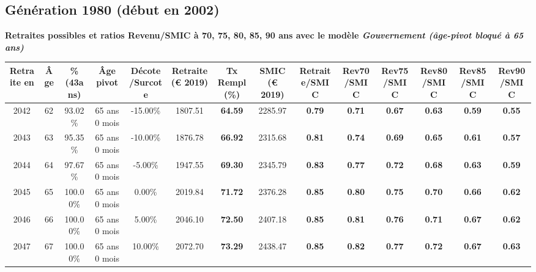 \newpage 
 
\subsection{Génération 1980 (début en 2002)} 

{\bf \noindent Retraites possibles et ratios Revenu/SMIC à 70, 75, 80, 85, 90 ans avec le modèle \emph{Gouvernement (âge-pivot bloqué à 65 ans)}}  
 
\begin{adjustbox}{max width=\textwidth} 
\begin{tabular}[htb]{|c|c||c|c|c||c|c||c||c|c|c|c|c|c|} 
\hline 
 Retraite en &  Âge &  \%(43ans) &  Âge pivot &  Décote/Surcote &  Retraite (\euro{} 2019) &  Tx Rempl(\%) &  SMIC (\euro{} 2019) &  Retraite/SMIC &  Rev70/SMIC &  Rev75/SMIC &  Rev80/SMIC &  Rev85/SMIC &  Rev90/SMIC \\ 
\hline \hline 
 2042 &  62 &  93.02\% &  65 ans 0 mois &  -15.00\% &  1807.51 &  {\bf 64.59} &  2285.97 &  {\bf {\color{red} 0.79}} &  {\bf {\color{red} 0.71}} &  {\bf {\color{red} 0.67}} &  {\bf {\color{red} 0.63}} &  {\bf {\color{red} 0.59}} &  {\bf {\color{red} 0.55}} \\ 
\hline 
 2043 &  63 &  95.35\% &  65 ans 0 mois &  -10.00\% &  1876.78 &  {\bf 66.92} &  2315.68 &  {\bf {\color{red} 0.81}} &  {\bf {\color{red} 0.74}} &  {\bf {\color{red} 0.69}} &  {\bf {\color{red} 0.65}} &  {\bf {\color{red} 0.61}} &  {\bf {\color{red} 0.57}} \\ 
\hline 
 2044 &  64 &  97.67\% &  65 ans 0 mois &  -5.00\% &  1947.55 &  {\bf 69.30} &  2345.79 &  {\bf {\color{red} 0.83}} &  {\bf {\color{red} 0.77}} &  {\bf {\color{red} 0.72}} &  {\bf {\color{red} 0.68}} &  {\bf {\color{red} 0.63}} &  {\bf {\color{red} 0.59}} \\ 
\hline 
 2045 &  65 &  100.00\% &  65 ans 0 mois &  0.00\% &  2019.84 &  {\bf 71.72} &  2376.28 &  {\bf {\color{red} 0.85}} &  {\bf {\color{red} 0.80}} &  {\bf {\color{red} 0.75}} &  {\bf {\color{red} 0.70}} &  {\bf {\color{red} 0.66}} &  {\bf {\color{red} 0.62}} \\ 
\hline 
 2046 &  66 &  100.00\% &  65 ans 0 mois &  5.00\% &  2046.10 &  {\bf 72.50} &  2407.18 &  {\bf {\color{red} 0.85}} &  {\bf {\color{red} 0.81}} &  {\bf {\color{red} 0.76}} &  {\bf {\color{red} 0.71}} &  {\bf {\color{red} 0.67}} &  {\bf {\color{red} 0.62}} \\ 
\hline 
 2047 &  67 &  100.00\% &  65 ans 0 mois &  10.00\% &  2072.70 &  {\bf 73.29} &  2438.47 &  {\bf {\color{red} 0.85}} &  {\bf {\color{red} 0.82}} &  {\bf {\color{red} 0.77}} &  {\bf {\color{red} 0.72}} &  {\bf {\color{red} 0.67}} &  {\bf {\color{red} 0.63}} \\ 
\hline 
\hline 
\end{tabular} 
\end{adjustbox} 
 

